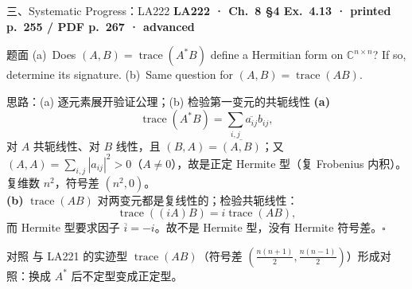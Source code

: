\documentclass[aspectratio=169,10pt,fontset=none]{ctexbeamer}
\newcommand{\ex}[1]{\textcolor{accent}{\footnotesize\bfseries #1}}
\begin{document}
\begin{frame}[t]{三、Systematic Progress：LA222}
  \leavevmode\ex{LA222 · Ch.~8 §4 Ex.~4.13 · printed p.~255 / PDF p.~267 · advanced}
  \begin{block}{\footnotesize 题面}
    \scriptsize (a)~Does $(A,B)=\operatorname{trace}(A^*B)$ define a Hermitian form on $\mathbb C^{n\times n}$? If so, determine its signature. (b)~Same question for $(A,B)=\operatorname{trace}(AB)$.
  \end{block}
  \begin{exampleblock}{\footnotesize 思路：(a) 逐元素展开验证公理；(b) 检验第一变元的共轭线性}
    \scriptsize
    \textbf{(a)}
    $$\operatorname{trace}(A^*B)=\sum_{i,j}\overline{a_{ij}}b_{ij},$$
    对 $A$ 共轭线性、对 $B$ 线性，且 $(B,A)=\overline{(A,B)}$；又 $(A,A)=\sum_{i,j}|a_{ij}|^2>0$（$A\ne0$），故是正定 Hermite 型（复 Frobenius 内积）。复维数 $n^2$，符号差 $\boxed{(n^2,0)}$。\\[2pt]
    \textbf{(b)} $\operatorname{trace}(AB)$ 对两变元都是复线性的；检验共轭线性：
    $$\operatorname{trace}((iA)B)=i\operatorname{trace}(AB),$$
    而 Hermite 型要求因子 $\overline i=-i$。故不是 Hermite 型，没有 Hermite 符号差。$\square$
  \end{exampleblock}
  \begin{block}{\footnotesize 对照}
    \scriptsize 与 LA221 的实迹型 $\operatorname{trace}(AB)$（符号差 $(\tfrac{n(n+1)}2,\tfrac{n(n-1)}2)$）形成对照：换成 $A^*$ 后不定型变成正定型。
  \end{block}
\end{frame}
\end{document}

